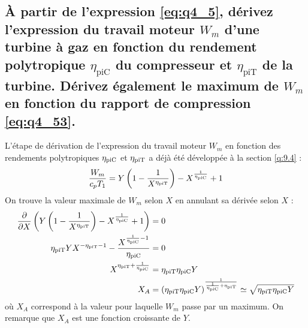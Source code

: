 \subsection{À partir de l'expression \ref{eq:q4_5}, dérivez l'expression du travail moteur $W_m$ d'une turbine à gaz en fonction du rendement polytropique $\eta_\text{piC}$ du compresseur et $\eta_\text{piT}$ de la turbine. Dérivez également le maximum de $W_m$ en fonction du rapport de compression \ref{eq:q4_53}.}
L'étape de dérivation de l'expression du travail moteur $W_m$ en fonction des rendements polytropiques $\eta_\text{piC}$ et $\eta_\text{piT}$ a déjà été développée à la section \ref{q:9.4} :
\begin{equation} \frac{W_m}{c_pT_1} = Y\left(1-\frac{1}{X^{\eta_\text{piT}}}\right) - X^{\frac{1}{\eta_\text{piC}}} + 1 \end{equation}
On trouve la valeur maximale de $W_m$ selon $X$ en annulant sa dérivée selon $X$ :
\begin{align} \frac{\partial }{\partial X}\left(Y\left(1-\frac{1}{X^{\eta_\text{piT}}}\right) - X^{\frac{1}{\eta_\text{piC}}} + 1\right) &= 0 \\ \eta_\text{piT} YX^{-\eta_\text{piT}-1} - \frac{X^{\frac{1}{\eta_\text{piC}}-1}}{\eta_\text{piC}} &= 0 \\ X^{\eta_\text{piT}+\frac{1}{\eta_\text{piC}}} &= \eta_\text{piT}\eta_\text{piC} Y \\ X_A &= \left(\eta_\text{piT}\eta_\text{piC} Y\right)^{\frac{1}{\frac{1}{\eta_\text{piC}}+\eta_\text{piT}}} \simeq \sqrt{\eta_\text{piT}\eta_\text{piC} Y} \end{align}
où $X_A$ correspond à la valeur pour laquelle $W_m$ passe par un maximum. On remarque que $X_A$ est une fonction croissante de $Y$.


